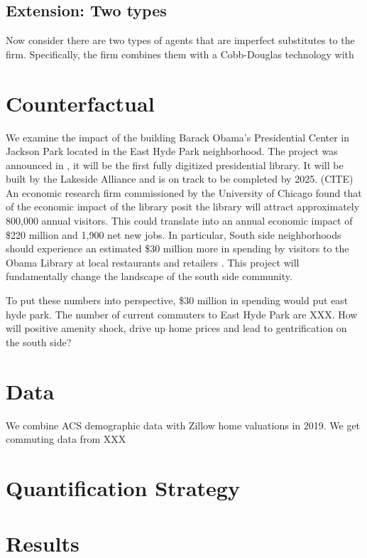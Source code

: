 \documentclass[12pt]{article}
\begin{document}
\subsection{Extension: Two types}
Now consider there are two types of agents that are imperfect substitutes to the firm. Specifically, the firm combines them with a Cobb-Douglas technology with 


\section{Counterfactual}

We examine the impact of the building Barack Obama’s Presidential Center in Jackson Park located in the East Hyde Park neighborhood. The project was announced in , it will be the first fully digitized presidential library. It will be built by the Lakeside Alliance and is on track to be completed by 2025. (CITE) An economic research firm commissioned by the University of Chicago found that of the economic impact of the library posit the library will attract approximately 800,000 annual visitors. This could translate into an annual economic impact of \$220 million and 1,900 net new jobs. In particular, South side neighborhoods should experience an estimated \$30 million more in spending by visitors to the Obama Library at local restaurants and retailers \citep{aeg2014}. This project will fundamentally change the landscape of the south side community. 

To put these numbers into perspective, \$30 million in spending would put east hyde park. The number of current commuters to East Hyde Park are XXX. How will positive amenity shock, drive up home prices and lead to gentrification on the south side?

\section{Data}

We combine ACS demographic data with Zillow home valuations in 2019. We get commuting data from XXX



\section{Quantification Strategy}



\section{Results}

\clearpage

\printbibliography
\end{document}
